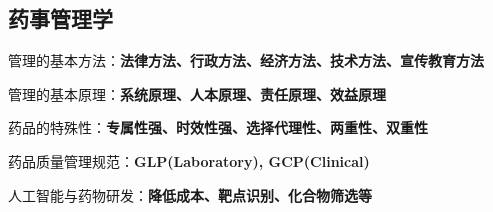 \subsection{药事管理学}%
\label{sub:复习：药事管理学}
\begin{notation}
    管理的基本方法：\textbf{法律方法、行政方法、经济方法、技术方法、宣传教育方法}
\end{notation}
\begin{notation}
    管理的基本原理：\textbf{系统原理、人本原理、责任原理、效益原理}
\end{notation}
\begin{notation}
    药品的特殊性：\textbf{专属性强、时效性强、选择代理性、两重性、双重性}
\end{notation}
\begin{notation}
药品质量管理规范：\textbf{GLP(Laboratory), GCP(Clinical)}
\end{notation}
\begin{notation}
    人工智能与药物研发：\textbf{降低成本、靶点识别、化合物筛选等}
\end{notation}
